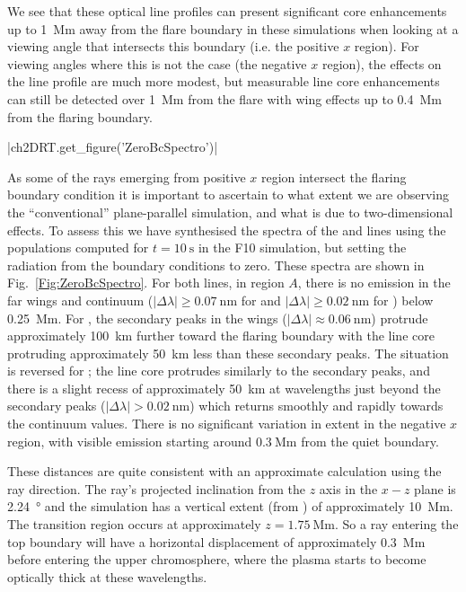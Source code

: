 We see that these optical line profiles can present significant core enhancements up to \SI{1}{\mega\metre} away from the flare boundary in these simulations when looking at a viewing angle that intersects this boundary (i.e. the positive $x$ region).
For viewing angles where this is not the case (the negative $x$ region), the effects on the line profile are much more modest, but measurable line core enhancements can still be detected over \SI{1}{\mega\metre} from the flare with wing effects up to \SI{0.4}{\mega\metre} from the flaring boundary.

\py[2DRT]|ch2DRT.get_figure('ZeroBcSpectro')|

As some of the rays emerging from positive $x$ region intersect the flaring boundary condition it is important to ascertain to what extent we are observing the ``conventional'' plane-parallel simulation, and what is due to two-dimensional effects.
To assess this we have synthesised the spectra of the \Ha{} and \CaLine{} lines using the populations computed for $t=\SI{10}{\second}$ in the F10 simulation, but setting the radiation from the boundary conditions to zero.
These spectra are shown in Fig.~\ref{Fig:ZeroBcSpectro}.
For both lines, in region $A$, there is no emission in the far wings and continuum ($|\Delta\lambda|\ge\SI{0.07}{\nano\metre}$ for \Ha{} and $|\Delta\lambda|\ge\SI{0.02}{\nano\metre}$ for \CaLine{}) below \SI{0.25}{\mega\metre}.
For \Ha{}, the secondary peaks in the wings ($|\Delta\lambda|\approx\SI{0.06}{\nano\metre}$) protrude approximately \SI{100}{\kilo\metre} further toward the flaring boundary with the line core protruding approximately \SI{50}{\kilo\metre} less than these secondary peaks.
The situation is reversed for \CaLine{}; the line core protrudes similarly to the secondary \Ha{} peaks, and there is a slight recess of approximately \SI{50}{\kilo\metre} at wavelengths just beyond the secondary peaks ($|\Delta\lambda| > \SI{0.02}{\nano\metre}$) which returns smoothly and rapidly towards the continuum values.
There is no significant variation in extent in the negative $x$ region, with visible emission starting around $\SI{0.3}{\mega\metre}$ from the quiet boundary.

These distances are quite consistent with an approximate calculation using the ray direction.
The ray's projected inclination from the $z$ axis in the $x-z$ plane is \SI{2.24}{\degree} and the simulation has a vertical extent (from \Radyn{}) of approximately \SI{10}{\mega\metre}.
The transition region occurs at approximately $z=\SI{1.75}{\mega\metre}$.
So a ray entering the top boundary will have a horizontal displacement of approximately \SI{0.3}{\mega\metre} before entering the upper chromosphere, where the plasma starts to become optically thick at these wavelengths.


